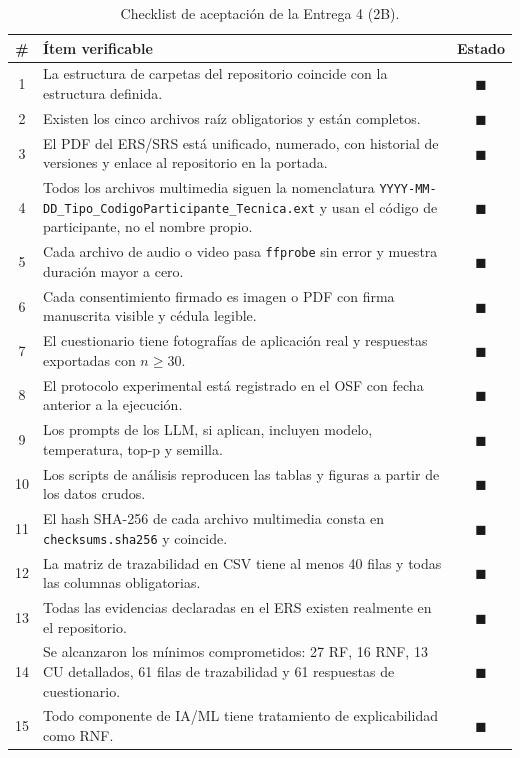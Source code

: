 \documentclass[journal,onecolumn]{IEEEtran}
\begin{document}
	\begin{table}[H]
		\centering
		\caption{Checklist de aceptación de la Entrega 4 (2B).}
		\label{tab:checklist}
		\small
		\begin{tabularx}{\textwidth}{@{}c X c@{}}
			\toprule
			\textbf{\#} & \textbf{Ítem verificable} & \textbf{Estado} \\
			\midrule
			1 & La estructura de carpetas del repositorio coincide con la estructura definida. & $\blacksquare$ \\
			2 & Existen los cinco archivos raíz obligatorios y están completos. & $\blacksquare$ \\
			3 & El PDF del ERS/SRS está unificado, numerado, con historial de versiones y enlace al repositorio en la portada. & $\blacksquare$ \\
			4 & Todos los archivos multimedia siguen la nomenclatura \texttt{YYYY-MM-DD\_Tipo\_CodigoParticipante\_Tecnica.ext} y usan el código de participante, no el nombre propio. & $\blacksquare$ \\
			5 & Cada archivo de audio o video pasa \texttt{ffprobe} sin error y muestra duración mayor a cero. & $\blacksquare$ \\
			6 & Cada consentimiento firmado es imagen o PDF con firma manuscrita visible y cédula legible. & $\blacksquare$ \\
			7 & El cuestionario tiene fotografías de aplicación real y respuestas exportadas con $n \geq 30$. & $\blacksquare$ \\
			8 & El protocolo experimental está registrado en el OSF con fecha anterior a la ejecución. & $\blacksquare$ \\
			9 & Los prompts de los LLM, si aplican, incluyen modelo, temperatura, top-p y semilla. & $\blacksquare$ \\
			10 & Los scripts de análisis reproducen las tablas y figuras a partir de los datos crudos. & $\blacksquare$ \\
			11 & El hash SHA-256 de cada archivo multimedia consta en \texttt{checksums.sha256} y coincide. & $\blacksquare$\\
			12 & La matriz de trazabilidad en CSV tiene al menos 40 filas y todas las columnas obligatorias. &$\blacksquare$ \\
			13 & Todas las evidencias declaradas en el ERS existen realmente en el repositorio. & $\blacksquare$ \\
			14 & Se alcanzaron los mínimos comprometidos: 27 RF, 16 RNF, 13 CU detallados, 61 filas de trazabilidad y 61 respuestas de cuestionario. & $\blacksquare$ \\
			15 & Todo componente de IA/ML tiene tratamiento de explicabilidad como RNF. & $\blacksquare$ \\
			\bottomrule
		\end{tabularx}
	\end{table}
	
	
\end{document}
